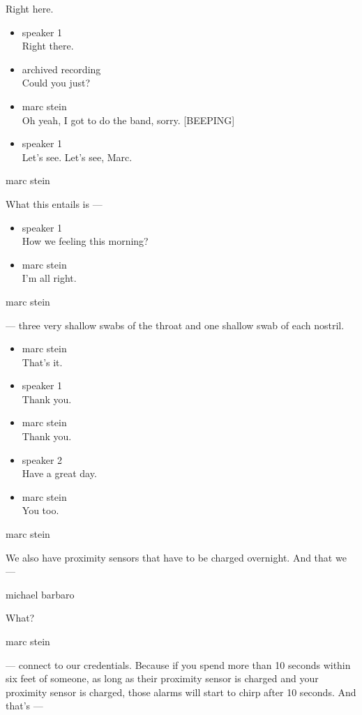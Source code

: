 Right here.

\begin{itemize}
\item
  speaker 1\\
  Right there.
\item
  archived recording\\
  Could you just?
\item
  marc stein\\
  Oh yeah, I got to do the band, sorry. {[}BEEPING{]}
\item
  speaker 1\\
  Let's see. Let's see, Marc.
\end{itemize}

marc stein

What this entails is ---

\begin{itemize}
\item
  speaker 1\\
  How we feeling this morning?
\item
  marc stein\\
  I'm all right.
\end{itemize}

marc stein

--- three very shallow swabs of the throat and one shallow swab of each
nostril.

\begin{itemize}
\item
  marc stein\\
  That's it.
\item
  speaker 1\\
  Thank you.
\item
  marc stein\\
  Thank you.
\item
  speaker 2\\
  Have a great day.
\item
  marc stein\\
  You too.
\end{itemize}

marc stein

We also have proximity sensors that have to be charged overnight. And
that we ---

michael barbaro

What?

marc stein

--- connect to our credentials. Because if you spend more than 10
seconds within six feet of someone, as long as their proximity sensor is
charged and your proximity sensor is charged, those alarms will start to
chirp after 10 seconds. And that's ---

